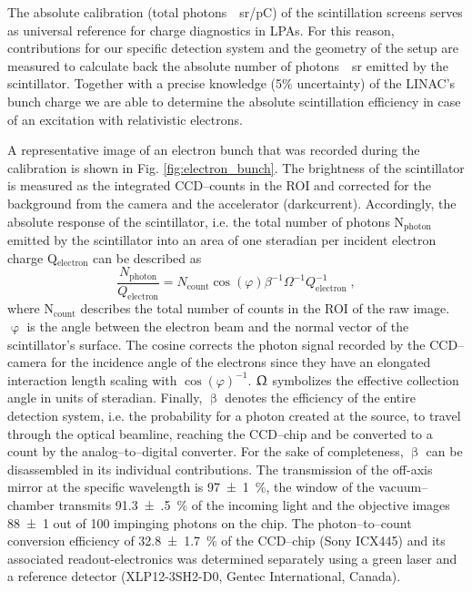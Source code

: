 \documentclass[%
preprint,
amsmath,
amssymb,
aip,
rsi, 
numerical,
floatfix,
]{revtex4-1}
\begin{document}
The absolute calibration (total \si[per-mode=symbol]{photons \per \steradian \per \pico \coulomb }) of the scintillation screens serves as universal reference for charge diagnostics in LPAs.
For this reason, contributions for our specific detection system and the geometry of the setup are measured to calculate back the absolute number of \si[per-mode=symbol]{photons \per \steradian} emitted by the scintillator. 
Together with a precise knowledge (5$\%$ uncertainty) of the LINAC's bunch charge we are able to determine  the absolute scintillation efficiency in case of an excitation with relativistic electrons.

A representative image of an electron bunch that was recorded during the calibration is shown in Fig. \ref{fig:electron_bunch}. 
The brightness of the scintillator is measured as the integrated CCD--counts in the ROI and corrected for the background from the camera and the accelerator (darkcurrent). 
Accordingly, the absolute response of the scintillator, i.e. the total number of photons N$_{\text{photon}}$ emitted by the scintillator into an area of one steradian per incident electron charge Q$_{\text{electron}}$ can be described as
\begin{equation}
\frac{N_{\text{photon}}}{Q_{\text{electron}}} = N_{\text{count}}\cos(\varphi)\beta^{-1}\Omega^{-1}Q_{\text{electron}}^{-1}{\;,}
\label{eq:ac}
\end{equation}
where N$_{\text{count}}$ describes the total number of counts in the ROI of the raw image.
$\upvarphi$ is the angle between the electron beam and the normal vector of the scintillator's surface.
The cosine corrects the photon signal recorded by the CCD--camera for the incidence angle of the electrons since they have an elongated interaction length scaling with $\cos(\varphi)^{-1}$.
$\Upomega$ symbolizes the effective collection angle in units of steradian.
Finally, $\upbeta$ denotes the efficiency of the entire detection system, i.e. the probability for a photon created at the source, to travel through the optical beamline, reaching the CCD--chip and be converted to a count by the analog--to--digital converter.
For the sake of completeness, $\upbeta$ can be disassembled in its individual contributions. 
The transmission of the off-axis mirror at the specific wavelength is \SI[separate-uncertainty = true]{97(1)}{\%}, the window of the vacuum--chamber transmits \SI[separate-uncertainty = true]{91.3(5)}{\%} of the incoming light and the objective images \num[separate-uncertainty = true]{88(1)} out of 100 impinging photons on the chip.
The photon--to--count conversion efficiency of \SI[separate-uncertainty = true]{32.8(17)}{\%} of the CCD--chip (Sony ICX445) and its associated readout-electronics was determined separately using a green laser and a reference detector (XLP12-3SH2-D0, Gentec International, Canada).
\end{document}
